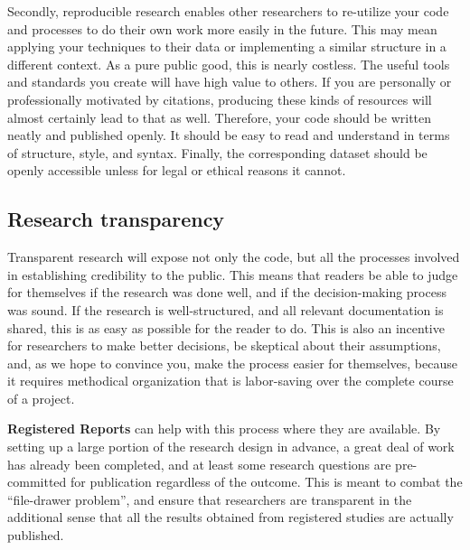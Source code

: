 Secondly, reproducible research
enables other researchers to re-utilize your code and processes
to do their own work more easily in the future.
This may mean applying your techniques to their data
or implementing a similar structure in a different context.
As a pure public good, this is nearly costless.
The useful tools and standards you create will have high value to others.
If you are personally or professionally motivated by citations,
producing these kinds of resources will almost certainly lead to that as well.
Therefore, your code should be written neatly and published openly.
It should be easy to read and understand in terms of structure, style, and syntax.
Finally, the corresponding dataset should be openly accessible
unless for legal or ethical reasons it cannot.

\subsection{Research transparency}

Transparent research will expose not only the code, but all the processes involved in establishing credibility to the public.
This means that readers be able to judge for themselves if the research was done well,
and if the decision-making process was sound.
If the research is well-structured, and all relevant documentation is shared,
this is as easy as possible for the reader to do.
This is also an incentive for researchers to make better decisions,
be skeptical about their assumptions,
and, as we hope to convince you, make the process easier for themselves,
because it requires methodical organization that is labor-saving over the complete course of a project.

\textbf{Registered Reports} can help with this process where they are available.
By setting up a large portion of the research design in advance,
a great deal of work has already been completed,
and at least some research questions are pre-committed for publication regardless of the outcome.
This is meant to combat the ``file-drawer problem'',\cite{simonsohn2014p}
and ensure that researchers are transparent in the additional sense that
all the results obtained from registered studies are actually published.

